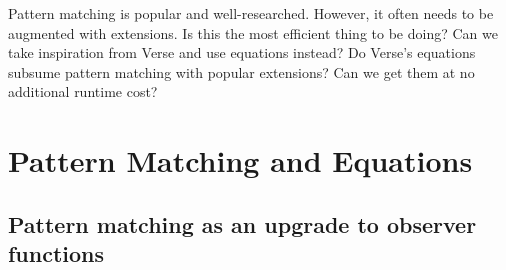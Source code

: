 \documentclass[manuscript,screen,review, 12pt]{acmart}
\begin{document}
Pattern matching is popular and well-researched. However, it often needs to be
augmented with extensions. Is this the most efficient thing to be doing? Can we
take inspiration from Verse and use equations instead? Do Verse's equations
subsume pattern matching with popular extensions? Can we get them at no
additional runtime cost? 


\section{Pattern Matching and Equations}
\subsection{Pattern matching as an upgrade to observer functions}
\end{document}

